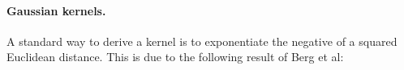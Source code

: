 



\paragraph*{Gaussian kernels.} A standard way to derive a kernel is to exponentiate the negative of a 
squared Euclidean distance. This is due to the following result of Berg et al:

